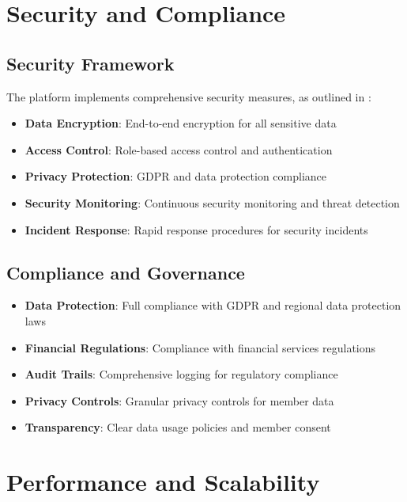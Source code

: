 \section{Security and Compliance}

\subsection{Security Framework}

The platform implements comprehensive security measures, as outlined in \citep{ferede_artificial_intelligence_ai}:

\begin{itemize}
    \item \textbf{Data Encryption}: End-to-end encryption for all sensitive data
    \item \textbf{Access Control}: Role-based access control and authentication
    \item \textbf{Privacy Protection}: GDPR and data protection compliance
    \item \textbf{Security Monitoring}: Continuous security monitoring and threat detection
    \item \textbf{Incident Response}: Rapid response procedures for security incidents
\end{itemize}

\subsection{Compliance and Governance}

\begin{itemize}
    \item \textbf{Data Protection}: Full compliance with GDPR and regional data protection laws
    \item \textbf{Financial Regulations}: Compliance with financial services regulations
    \item \textbf{Audit Trails}: Comprehensive logging for regulatory compliance
    \item \textbf{Privacy Controls}: Granular privacy controls for member data
    \item \textbf{Transparency}: Clear data usage policies and member consent
\end{itemize}

\section{Performance and Scalability}

